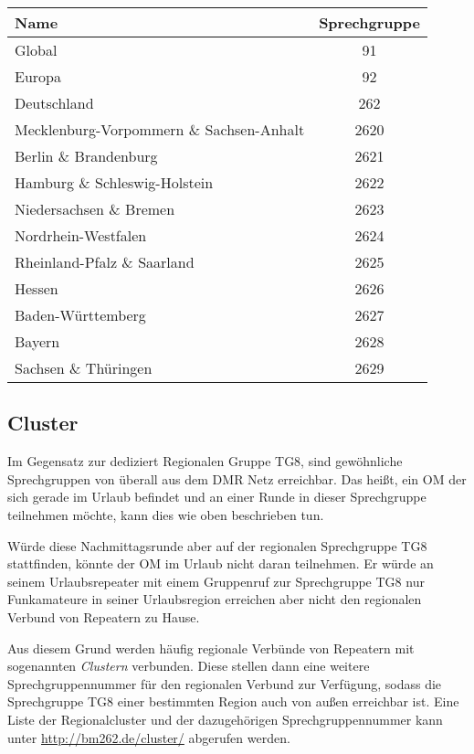 \begin{table}[!ht]
 \centering
 \begin{tabular}{|l|c|} \hline
  Name & Sprechgruppe \\ \hline
  Global & 91 \\
  Europa & 92 \\
  Deutschland & 262 \\
  Mecklenburg-Vorpommern \& Sachsen-Anhalt & 2620 \\
  Berlin \& Brandenburg & 2621 \\
  Hamburg \& Schleswig-Holstein & 2622 \\
  Niedersachsen \& Bremen & 2623 \\
  Nordrhein-Westfalen & 2624 \\
  Rheinland-Pfalz \& Saarland & 2625 \\
  Hessen & 2626 \\
  Baden-Württemberg & 2627 \\
  Bayern & 2628 \\
  Sachsen \& Thüringen & 2629 \\ \hline
 \end{tabular}
 \caption{} \label{tab:talkgroups}
\end{table}

\subsection{Cluster}
Im Gegensatz zur dediziert Regionalen Gruppe TG8, sind gewöhnliche Sprechgruppen von überall aus dem DMR Netz erreichbar. Das heißt, ein OM der sich gerade im Urlaub befindet und an einer Runde in dieser Sprechgruppe teilnehmen möchte, kann dies wie oben beschrieben tun. 

Würde diese Nachmittagsrunde aber auf der regionalen Sprechgruppe TG8 stattfinden, könnte der OM im Urlaub nicht daran teilnehmen. Er würde an seinem Urlaubsrepeater mit einem Gruppenruf zur Sprechgruppe TG8 nur Funkamateure in seiner Urlaubsregion erreichen aber nicht den regionalen Verbund von Repeatern zu Hause.

Aus diesem Grund werden häufig regionale Verbünde von Repeatern mit sogenannten \emph{Clustern} verbunden. Diese  stellen dann eine weitere Sprechgruppennummer für den regionalen Verbund zur Verfügung, sodass die Sprechgruppe TG8 einer bestimmten Region auch von außen erreichbar ist. Eine Liste der Regionalcluster und der dazugehörigen Sprechgruppennummer kann unter \url{http://bm262.de/cluster/} abgerufen werden.
